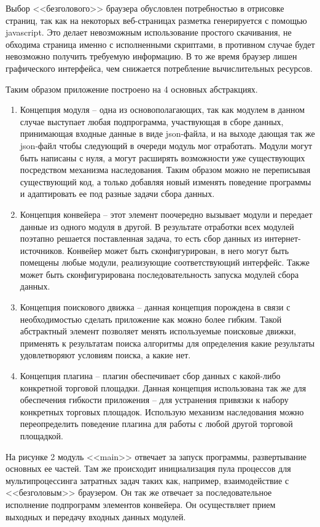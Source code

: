 \documentclass[../main]{subfiles}
\begin{document}
Выбор <<безголового>> браузера обусловлен потребностью в отрисовке страниц, так как на некоторых веб-страницах разметка генерируется с помощью javascript. Это делает невозможным использование простого скачивания, не обходима страница именно с исполненными скриптами, в противном случае будет невозможно получить требуемую информацию. В то же время браузер лишен графического интерфейса, чем снижается потребление вычислительных ресурсов. 

Таким образом приложение построено на 4 основных абстракциях.

\begin{enumerate}
    \item Концепция модуля – одна из основополагающих, так как модулем в данном случае выступает любая подпрограмма, участвующая в сборе данных, принимающая входные данные в виде json-файла, и на выходе дающая так же json-файл чтобы следующий в очереди модуль мог отработать. Модули могут быть написаны с нуля, а могут расширять возможности уже существующих посредством механизма наследования. Таким образом можно не переписывая существующий код, а только добавляя новый изменять поведение программы и адаптировать ее под разные задачи сбора данных.
    \item Концепция конвейера – этот элемент поочередно вызывает модули и передает данные из одного модуля в другой. В результате отработки всех модулей поэтапно решается поставленная задача, то есть сбор данных из интернет-источников. Конвейер может быть сконфигурирован, в него могут быть помещены любые модули, реализующие соответствующий интерфейс. Также может быть сконфигурирована последовательность запуска модулей сбора данных.
    \item Концепция поискового движка – данная концепция порождена в связи с необходимостью сделать приложение как можно более гибким. Такой абстрактный элемент позволяет менять используемые поисковые движки, применять к результатам поиска алгоритмы для определения какие результаты удовлетворяют условиям поиска, а какие нет.
    \item Концепция плагина – плагин обеспечивает сбор данных с какой-либо конкретной торговой площадки. Данная концепция использована так же для обеспечения гибкости приложения – для устранения привязки к набору конкретных торговых площадок. Использую механизм наследования можно переопределить поведение плагина для работы с любой другой торговой площадкой. 
\end{enumerate}

На рисунке 2 модуль <<main>> отвечает за запуск программы, развертывание основных ее частей. Там же происходит инициализация пула процессов для мультипроцессинга затратных задач таких как, например, взаимодействие с <<безголовым>> браузером. Он так же отвечает за последовательное исполнение подпрограмм элементов конвейера. Он осуществляет прием выходных и передачу входных данных модулей.
\end{document}

